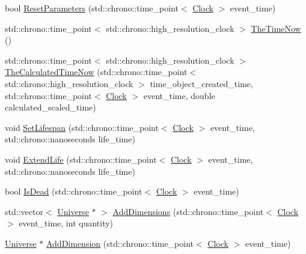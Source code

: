 \begin{DoxyCompactItemize}
\item 
bool \mbox{\hyperlink{classUniverse_a1d92b2277564577571c802f6e0c206dd}{Reset\+Parameters}} (std\+::chrono\+::time\+\_\+point$<$ \mbox{\hyperlink{universe_8h_a0ef8d951d1ca5ab3cfaf7ab4c7a6fd80}{Clock}} $>$ event\+\_\+time)
\item 
std\+::chrono\+::time\+\_\+point$<$ std\+::chrono\+::high\+\_\+resolution\+\_\+clock $>$ \mbox{\hyperlink{classUniverse_ae54d34c5d695917e074b8e07e8820bdb}{The\+Time\+Now}} ()
\item 
std\+::chrono\+::time\+\_\+point$<$ std\+::chrono\+::high\+\_\+resolution\+\_\+clock $>$ \mbox{\hyperlink{classUniverse_aa220508c4cc12b02c6fe494622ebb58d}{The\+Calculated\+Time\+Now}} (std\+::chrono\+::time\+\_\+point$<$ std\+::chrono\+::high\+\_\+resolution\+\_\+clock $>$ time\+\_\+object\+\_\+created\+\_\+time, std\+::chrono\+::time\+\_\+point$<$ \mbox{\hyperlink{universe_8h_a0ef8d951d1ca5ab3cfaf7ab4c7a6fd80}{Clock}} $>$ event\+\_\+time, double calculated\+\_\+scaled\+\_\+time)
\item 
void \mbox{\hyperlink{classUniverse_ac3443dd59b61ae3110f07f681f63ed0a}{Set\+Lifespan}} (std\+::chrono\+::time\+\_\+point$<$ \mbox{\hyperlink{universe_8h_a0ef8d951d1ca5ab3cfaf7ab4c7a6fd80}{Clock}} $>$ event\+\_\+time, std\+::chrono\+::nanoseconds life\+\_\+time)
\item 
void \mbox{\hyperlink{classUniverse_a982502e46868a00a9111738ccc9355c2}{Extend\+Life}} (std\+::chrono\+::time\+\_\+point$<$ \mbox{\hyperlink{universe_8h_a0ef8d951d1ca5ab3cfaf7ab4c7a6fd80}{Clock}} $>$ event\+\_\+time, std\+::chrono\+::nanoseconds life\+\_\+time)
\item 
bool \mbox{\hyperlink{classUniverse_a8fdaa6d06584e1ef50c4c613b22b786e}{Is\+Dead}} (std\+::chrono\+::time\+\_\+point$<$ \mbox{\hyperlink{universe_8h_a0ef8d951d1ca5ab3cfaf7ab4c7a6fd80}{Clock}} $>$ event\+\_\+time)
\item 
std\+::vector$<$ \mbox{\hyperlink{classUniverse}{Universe}} $\ast$ $>$ \mbox{\hyperlink{classUniverse_a03bdf5f7fea4209241e9bf5316d45517}{Add\+Dimensions}} (std\+::chrono\+::time\+\_\+point$<$ \mbox{\hyperlink{universe_8h_a0ef8d951d1ca5ab3cfaf7ab4c7a6fd80}{Clock}} $>$ event\+\_\+time, int quantity)
\item 
\mbox{\hyperlink{classUniverse}{Universe}} $\ast$ \mbox{\hyperlink{classUniverse_a6326158c47bf3f7fe9297299a9b5b7b7}{Add\+Dimension}} (std\+::chrono\+::time\+\_\+point$<$ \mbox{\hyperlink{universe_8h_a0ef8d951d1ca5ab3cfaf7ab4c7a6fd80}{Clock}} $>$ event\+\_\+time)
\item 

\end{DoxyCompactItemize}
